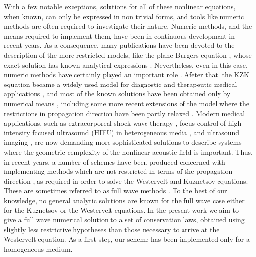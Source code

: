 With a few notable exceptions, solutions for all of these nonlinear equations, when known, can only be expressed in non trivial forms, and tools like numeric methods are often required to investigate their nature. 
Numeric methods, and the means required to implement them, have been in continuous development in recent years. 
As a consequence, many publications have been devoted to the description of the more restricted models, like the plane Burgers equation \citep{crighton1979asymptotic}, whose exact solution has known analytical expressions \citep{crighton1979asymptotic, blackstock1966connection, jordan}. 
Nevertheless, even in this case, numeric methods have certainly played an important role \citep{yang1992comparative}. 
Afeter that, the KZK equation became a widely used model for diagnostic and therapeutic medical applications \citep{duck}, and most of the known solutions have been obtained only by numerical means \citep{khokhlova2001numerical}, including some more recent extensions of the model where the restrictions in propagation direction have been partly relaxed \citep{yuldashev2011simulation, dagrau2011acoustic, varray2011fundamental, varslot2005computer}. 
Modern medical applications, such as extracorporeal shock wave therapy \citep{fagnan2008high}, focus control of high intensity focused ultrasound (HIFU) in heterogeneous media \citep{okita2011development}, and ultrasound imaging \citep{huijssen2010iterative}, are now demanding more sophisticated solutions to describe systems where the geometric complexity of the nonlinear acoustic field is important. 
Thus, in recent years, a number of schemes have been produced concerned with implementing methods which are not restricted in terms of the propagation direction \citep{christopher1991new, albin, demi2011contrast, okita2011development, huijssen2010iterative, karamalis, hallaj1999fdtd, pinton2009heterogeneous}, as required in order to solve the Westervelt and Kuznetsov equations. 
These are sometimes referred to as full wave methods \citep{hallaj1999fdtd}. 
To the best of our knowledge, no general analytic solutions are known for the full wave case either for the Kuznetsov or the Westervelt equations. 
In the present work we aim to give a full wave numerical solution to a set of conservation laws, obtained using slightly less restrictive hypotheses than those necessary to arrive at the Westervelt equation. 
As a first step, our scheme has been implemented only for a homogeneous medium.

